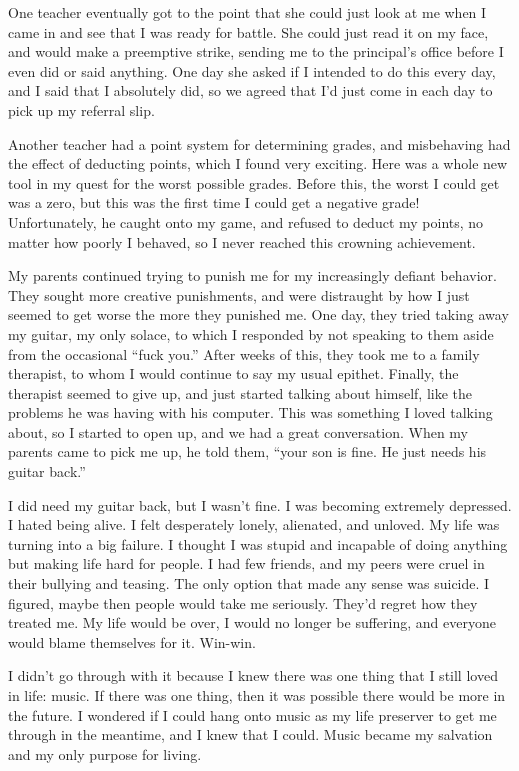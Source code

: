 One teacher eventually got to the point that she could just look at me when I came in and see that I was ready for battle. She could just read it on my face, and would make a preemptive strike, sending me to the principal's office before I even did or said anything. One day she asked if I intended to do this every day, and I said that I absolutely did, so we agreed that I'd just come in each day to pick up my referral slip.

Another teacher had a point system for determining grades, and misbehaving had the effect of deducting points, which I found very exciting. Here was a whole new tool in my quest for the worst possible grades. Before this, the worst I could get was a zero, but this was the first time I could get a negative grade! Unfortunately, he caught onto my game, and refused to deduct my points, no matter how poorly I behaved, so I never reached this crowning achievement.

My parents continued trying to punish me for my increasingly defiant behavior. They sought more creative punishments, and were distraught by how I just seemed to get worse the more they punished me. One day, they tried taking away my guitar, my only solace, to which I responded by not speaking to them aside from the occasional ``fuck you.'' After weeks of this, they took me to a family therapist, to whom I would continue to say my usual epithet. Finally, the therapist seemed to give up, and just started talking about himself, like the problems he was having with his computer. This was something I loved talking about, so I started to open up, and we had a great conversation. When my parents came to pick me up, he told them, ``your son is fine. He just needs his guitar back.''

I did need my guitar back, but I wasn't fine. I was becoming extremely depressed. I hated being alive. I felt desperately lonely, alienated, and unloved. My life was turning into a big failure. I thought I was stupid and incapable of doing anything but making life hard for people. I had few friends, and my peers were cruel in their bullying and teasing. The only option that made any sense was suicide. I figured, maybe then people would take me seriously. They'd regret how they treated me. My life would be over, I would no longer be suffering, and everyone would blame themselves for it. Win-win.

I didn't go through with it because I knew there was one thing that I still loved in life: music. If there was one thing, then it was possible there would be more in the future. I wondered if I could hang onto music as my life preserver to get me through in the meantime, and I knew that I could. Music became my salvation and my only purpose for living.

